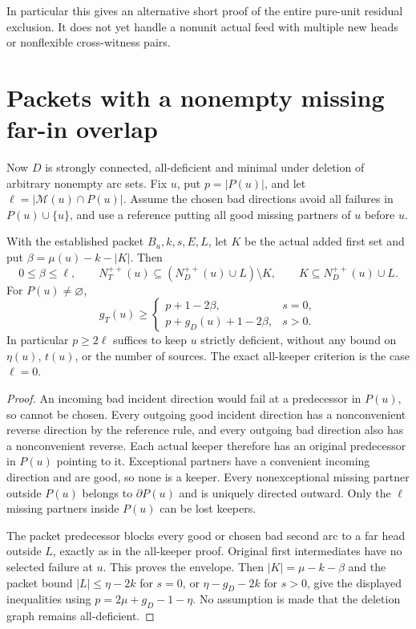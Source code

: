 In particular this gives an alternative short proof of the entire
pure-unit residual exclusion. It does not yet handle a nonunit actual
feed with multiple new heads or nonflexible cross-witness pairs.

\section{Packets with a nonempty missing far-in overlap}
\label{sec:global-overlap-packet}

Now $D$ is strongly connected, all-deficient and minimal under deletion
of arbitrary nonempty arc sets. Fix $u$, put $p=|P(u)|$, and let
$\ell=|\mathcal M(u)\cap P(u)|$. Assume the chosen bad directions avoid
all failures in $P(u)\cup\{u\}$, and use a reference putting all good
missing partners of $u$ before $u$.

\begin{lemma}
\label{lem:global-overlap-keeper-budget}
With the established packet $B_u,k,s,E,L$, let $K$ be the actual added
first set and put $\beta=\mu(u)-k-|K|$. Then
\[
 0\le\beta\le\ell,\qquad
 N_T^{++}(u)\subseteq(N_D^{++}(u)\cup L)\setminus K,
 \qquad K\subseteq N_D^{++}(u)\cup L.
\]
For $P(u)\ne\varnothing$,
\[
 g_T(u)\ge
 \begin{cases}p+1-2\beta,&s=0,\\p+g_D(u)+1-2\beta,&s>0.\end{cases}
\]
In particular $p\ge2\ell$ suffices to keep $u$ strictly deficient,
without any bound on $\eta(u)$, $t(u)$, or the number of sources.
The exact all-keeper criterion is the case $\ell=0$.
\end{lemma}
\begin{proof}
An incoming bad incident direction would fail at a predecessor in $P(u)$,
so cannot be chosen. Every outgoing good incident direction has a
nonconvenient reverse direction by the reference rule, and every outgoing
bad direction also has a nonconvenient reverse. Each actual keeper
therefore has an original predecessor in $P(u)$ pointing to it.
Exceptional partners have a convenient incoming direction and are good,
so none is a keeper. Every nonexceptional missing partner outside $P(u)$
belongs to $\partial P(u)$ and is uniquely directed outward. Only the
$\ell$ missing partners inside $P(u)$ can be lost keepers.

The packet predecessor blocks every good or chosen bad second arc to a
far head outside $L$, exactly as in the all-keeper proof. Original first
intermediates have no selected failure at $u$. This proves the envelope.
Then $|K|=\mu-k-\beta$ and the packet bound
$|L|\le\eta-2k$ for $s=0$, or $\eta-g_D-2k$ for $s>0$, give
the displayed inequalities using $p=2\mu+g_D-1-\eta$.
No assumption is made that the deletion graph remains all-deficient.
\end{proof}

